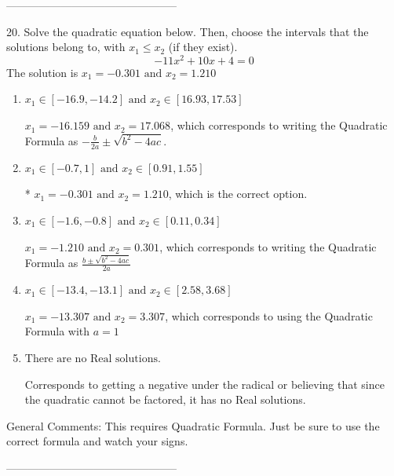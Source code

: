 \documentclass{article}[14pt]
\begin{document}
-----------------------------------------------

20. Solve the quadratic equation below. Then, choose the intervals that the solutions belong to, with $x_1 \leq x_2$ (if they exist).
$$ -11x^{2} +10 x + 4 = 0 $$ 
The solution is $ x_1 = -0.301 \text{ and } x_2 = 1.210 $ 

\begin{enumerate}[label=\Alph*.] 
\item $ x_1 \in [-16.9, -14.2] \text{ and } x_2 \in [16.93, 17.53] $ 

  $x_1 = -16.159 \text{ and } x_2 = 17.068$, which corresponds to writing the Quadratic Formula as $-\frac{b}{2a} \pm \sqrt{b^2 - 4ac}$. 
\item $ x_1 \in [-0.7, 1] \text{ and } x_2 \in [0.91, 1.55] $ 

 * $x_1 = -0.301 \text{ and } x_2 = 1.210$, which is the correct option. 
\item $ x_1 \in [-1.6, -0.8] \text{ and } x_2 \in [0.11, 0.34] $ 

  $x_1 = -1.210 \text{ and } x_2 = 0.301$, which corresponds to writing the Quadratic Formula as $\frac{b \pm \sqrt{b^2 - 4ac}}{2a}$ 
\item $ x_1 \in [-13.4, -13.1] \text{ and } x_2 \in [2.58, 3.68] $ 

  $x_1 = -13.307 \text{ and } x_2 = 3.307$, which corresponds to using the Quadratic Formula with $a=1$ 
\item $ \text{There are no Real solutions.} $ 

 Corresponds to getting a negative under the radical or believing that since the quadratic cannot be factored, it has no Real solutions. 
\end{enumerate} 
 
General Comments: This requires Quadratic Formula. Just be sure to use the correct formula and watch your signs.

-----------------------------------------------
\end{document}
